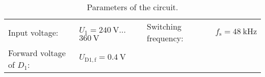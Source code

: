 
\begin{table}[ht]
    \centering  %
    \begin{tabular}{llll}
        \toprule
        Input voltage: &  $U_{\mathrm{1}} = \SI{240}{\volt}$...$\SI{360}{\volt}$ & Switching frequency: & $f_{\mathrm{s}} = \SI{48}{\kilo\hertz}$\\ 
        Forward voltage of $D_{\mathrm{1}}$: & $U_{\mathrm{D1,f}} = \SI{0.4}{\volt}$  &  & \\ 
        \bottomrule
    \end{tabular}
    \caption{Parameters of the circuit.}  %
    \label{table:Ex04_Parameters of the singled ended forward converter.}
\end{table}